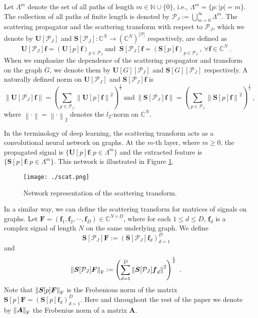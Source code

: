 \documentclass{article}
\def\CC{\mathbb{C}}
\def\NN{\mathbb{N}}
\def\cP{\mathcal{P}}
\def\BA{\boldsymbol{A}}
\def\BF{\boldsymbol{F}}
\def\BS{\boldsymbol{S}}
\def\BU{\boldsymbol{U}}
\def\Bf{\boldsymbol{f}}
\newcommand{\F}{\textup{\mbox{F}}}
\newcommand{\abs}[1]{\left| #1 \right|}
\newcommand{\norm}[1]{\left\lVert#1\right\rVert}
\begin{document}
Let $\Lambda^m$ denote the set of all paths of length $m \in \NN \cup \{0\}$, i.e., $\Lambda^m = \{p: \abs{p} = m \}$. The collection of all paths of finite length is denoted by $\cP_J := \bigcup_{m = 0}^{\infty} \Lambda^m$.
The scattering propagator and the scattering transform with respect to $\cP_J$, which we denote by $\BU[\cP_J]$ and $\BS[\cP_J]: \CC^N \rightarrow (\CC^N)^{\abs{\cP}}$ respectively, are defined as
\begin{equation}
\BU[\cP_J]\Bf = \left( \BU[p] \Bf \right)_{p \in \cP_J} ~\mbox{and }~ \BS[\cP_J]\Bf = \left( \BS[p] \Bf \right)_{p \in \cP_J} ~,~ \forall \Bf \in \CC^N ~.
\end{equation}
When we emphasize the dependence of the scattering propagator and transform on the graph $G$, we denote them by $\BU[G][\cP_J]$ and $\BS[G][\cP_J]$ respectively. A naturally defined norm on $\BU[\cP_J]$ and $\BS[\cP_J] \Bf$ is
\begin{equation}\label{eq:defUPSP}
\norm{\BU[\cP_J] \Bf} = \left( \sum_{p \in \cP_J} \norm{ \BU[p] \Bf }^2 \right)^{\frac{1}{2}} 
~ \mbox{and} ~
\norm{\BS[\cP_J] \Bf} = \left( \sum_{p \in \cP_J} \norm{ \BS[p] \Bf }^2 \right)^{\frac{1}{2}} ~,
\end{equation}
where $\norm{\cdot} = \norm{\cdot}_2$ denotes the $l_2$-norm on $\CC^N$. 

In the terminology of deep learning, the scattering transform acts as a convolutional neural network on graphs. At the $m$-th layer, where $m \geq 0$,  the propagated signal is $\{\BU[p]\Bf: p \in \Lambda^m \}$ and the extracted feature is $\{\BS[p]\Bf: p \in \Lambda^m \}$. This network is illustrated in Figure \ref{fig:cnn}.

\begin{figure}[!ht]
\centering
\texttt{[image: ./scat.png]}
\caption{Network representation of the scattering transform.}
\label{fig:cnn}
\end{figure}

In a similar way, we can define the scattering transform for matrices of signals on graphs. Let $\BF = (\Bf_1, \Bf_2, \cdots, \Bf_D) \in \CC^{N \times D}$, where for each $1 \leq d \leq D$, $\Bf_d$  is a  complex signal of length $N$ on the same underlying graph. We define
\begin{equation}
\BS[\cP_J] \BF := \left( \BS[\cP_J] \Bf_d \right)_{d=1}^D
\end{equation}
and
\begin{equation}
\norm{\BS[\cP_J]\BF}_{\F} := \left( \sum_{d=1}^D \norm{\BS[\cP_J]\Bf_d}^2 \right)^{\frac{1}{2}} ~.
\end{equation}
Note that $\norm{\BS[p]\BF}_{\F}$ is the Frobenious norm of the matrix $\BS[p]\BF = \left( \BS[p]\Bf_d \right)_{d=1}^D$. Here and throughout the rest of the paper we denote by $\norm{\BA}_{\F}$ the Frobenius norm of a matrix $\BA$.
\end{document}
